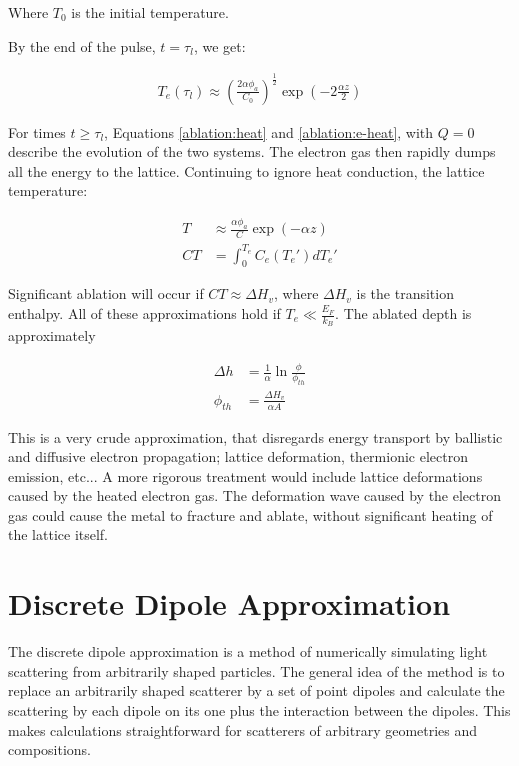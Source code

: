        Where $T_0$ is the initial temperature.

        By the end of the pulse, $t = \tau_l$, we get:

        \begin{align}
            T_e(\tau_l) \approx \left(\frac{2\alpha\phi_a}{C_0}\right)^{\frac{1}{2}}\exp\left(-2\frac{\alpha z}{2}\right)
        \end{align}

        For times $t \geq \tau_l$, Equations \ref{ablation:heat} and \ref{ablation:e-heat}, with $Q = 0$ describe the evolution of the
        two systems. The electron gas then rapidly dumps all the energy to the lattice. Continuing to ignore heat conduction, the lattice
        temperature:

        \begin{align}
            T &\approx \frac{\alpha \phi_a}{C}\exp(-\alpha z) \\
            CT &= \int_0^{T_e} C_e(T_e')dT_e'
        \end{align}

        Significant ablation will occur if $CT \approx \Delta H_v$, where $\Delta H_v$ is the transition enthalpy. All of these approximations
        hold if $T_e \ll \frac{E_F}{k_B}$. The ablated depth is approximately

        \begin{align}
            \Delta h &= \frac{1}{\alpha}\ln\frac{\phi}{\phi_{th}}\\
            \phi_{th} &= \frac{\Delta H_v}{\alpha A}
        \end{align}

        This is a very crude approximation, that disregards energy transport by ballistic and diffusive electron propagation; lattice deformation,
        thermionic electron emission, etc... A more rigorous treatment would include lattice deformations caused by the heated electron gas. The
        deformation wave caused by the electron gas could cause the metal to fracture and ablate, without significant heating of the lattice itself.

\section{Discrete Dipole Approximation}
\label{ap:DDA}

    The discrete dipole approximation is a method of numerically simulating light scattering from arbitrarily shaped particles.
    The general idea of the method is to replace an arbitrarily shaped scatterer by a set of point dipoles and calculate the
    scattering by each dipole on its one plus the interaction between the dipoles. This makes calculations straightforward
    for scatterers of arbitrary geometries and compositions.

